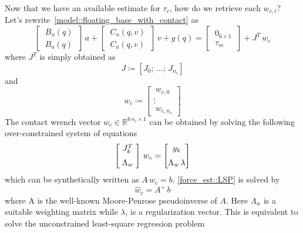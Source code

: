 \documentclass[letterpaper, 10 pt, conference]{ieeeconf}  %
\begin{document}
Now that we have an available estimate for $\tau_c$, how do we retrieve each $w_{c, i}$?
Let's rewrite~\eqref{model::floating_base_with_contact} as 
\begin{dmath}\label{model::floating_base_with_contact}
	\begin{bmatrix}
		~B_u(q)~\\
		~B_a(q)~
	\end{bmatrix}\,a + \begin{bmatrix}
		~C_u(q, v)~\\
		~C_a(q, v)~
	\end{bmatrix}\,v + g(q) = \begin{bmatrix}
		~0_{6\times 1}~\\
		~\tau_{m}~
	\end{bmatrix} + J^{T}\,w_{c}
\end{dmath}
where $J^{T}$ is simply obtained as
\begin{equation}\label{model::stacked_jacobian}
J\coloneqq \left[J_0;\,\dots;\,J_{n_c} \right]
\end{equation}
and 
\begin{equation}\label{model::stacked_wrenches}
w_c\coloneqq \begin{bmatrix}
~w_{c, 0}~\\
\vdots\\
~w_{c, n_c}
\end{bmatrix}
\end{equation}
The contact wrench vector $w_c\in\mathbb{R}^{6\,n_c \times 1}$ can be obtained by solving the following over-constrained system of equations
\begin{equation}\label{force_est::LSP}
\begin{bmatrix}
~J^T_k~\vspace{0.2cm}\\
\Lambda_w
\end{bmatrix}\,w_c = \begin{bmatrix}
~y_k~\vspace{0.2cm}\\
\Lambda_w\,\lambda
\end{bmatrix}
\end{equation}
which can be synthetically written as $A\,w_c=b$.
\eqref{force_est::LSP} is solved by
\begin{equation}
\hat{w}_c = A^{+}\,b
\end{equation}
where A is the well-known Moore-Penrose pseudoinverse of $A$.
Here $\Lambda_w$ is a suitable weighting matrix while $\lambda$, is a regularization vector.
This is equivalent to solve the unconstrained least-square regression problem
\end{document}
